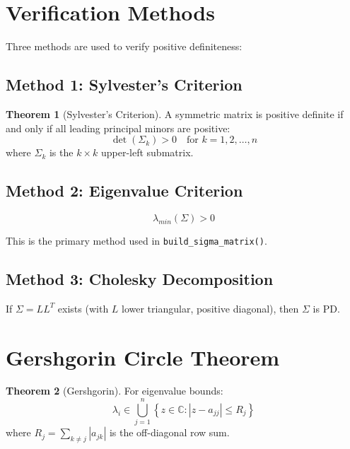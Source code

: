 \documentclass[11pt]{article}
\theoremstyle{definition}
\newtheorem{theorem}{Theorem}
\begin{document}
\section{Verification Methods}

Three methods are used to verify positive definiteness:

\subsection{Method 1: Sylvester's Criterion}

\begin{theorem}[Sylvester's Criterion]
A symmetric matrix is positive definite if and only if all leading principal
minors are positive:
\begin{equation}
\det(\Sigma_k) > 0 \quad \text{for } k = 1, 2, \ldots, n
\end{equation}
where $\Sigma_k$ is the $k \times k$ upper-left submatrix.
\end{theorem}

\subsection{Method 2: Eigenvalue Criterion}

\begin{equation}
\lambda_{min}(\Sigma) > 0
\end{equation}

This is the primary method used in \texttt{build\_sigma\_matrix()}.

\subsection{Method 3: Cholesky Decomposition}

If $\Sigma = LL^T$ exists (with $L$ lower triangular, positive diagonal),
then $\Sigma$ is PD.

\section{Gershgorin Circle Theorem}

\begin{theorem}[Gershgorin]
For eigenvalue bounds:
\begin{equation}
\lambda_i \in \bigcup_{j=1}^{n} \left\{ z \in \mathbb{C} : |z - a_{jj}| \leq R_j \right\}
\end{equation}
where $R_j = \sum_{k \neq j} |a_{jk}|$ is the off-diagonal row sum.
\end{theorem}
\end{document}

